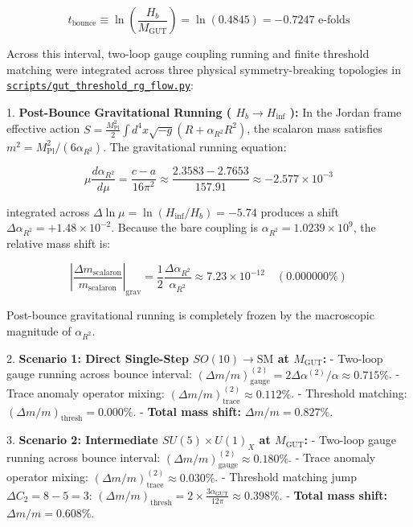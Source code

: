 \documentclass[11pt,a4paper]{article}
\theoremstyle{definition}
\theoremstyle{remark}
\begin{document}
\begin{equation}
t_{\text{bounce}} \equiv \ln\left(\frac{H_b}{M_{\text{GUT}}}\right) = \ln(0.4845) = -0.7247 \text{ e-folds}
\end{equation}


Across this interval, two-loop gauge coupling running and finite threshold matching were integrated across three physical symmetry-breaking topologies in \href{../../scripts/gut_threshold_rg_flow.py}{\texttt{scripts/gut_threshold_rg_flow.py}}:

1. \textbf{Post-Bounce Gravitational Running ( $H_b \to H_{\text{inf}}$ ):}
In the Jordan frame effective action $S = \frac{M_{\text{Pl}}^2}{2}\int d^4x\sqrt{-g}(R + \alpha_{R^2} R^2)$, the scalaron mass satisfies $m^2 = M_{\text{Pl}}^2 / (6\alpha_{R^2})$. The gravitational running equation:


\begin{equation}
\mu \frac{d\alpha_{R^2}}{d\mu} = \frac{c - a}{16\pi^2} \approx \frac{2.3583 - 2.7653}{157.91} \approx -2.577 \times 10^{-3}
\end{equation}


integrated across $\Delta\ln\mu = \ln(H_{\text{inf}}/H_b) = -5.74$ produces a shift $\Delta\alpha_{R^2} = +1.48 \times 10^{-2}$. Because the bare coupling is $\alpha_{R^2} = 1.0239 \times 10^9$, the relative mass shift is:


\begin{equation}
\left|\frac{\Delta m_{\text{scalaron}}}{m_{\text{scalaron}}}\right|_{\text{grav}} = \frac{1}{2} \frac{\Delta\alpha_{R^2}}{\alpha_{R^2}} \approx 7.23 \times 10^{-12} \quad (\mathbf{0.000000\%})
\end{equation}


Post-bounce gravitational running is completely frozen by the macroscopic magnitude of $\alpha_{R^2}$.

2. \textbf{Scenario 1: Direct Single-Step $SO(10) \to \text{SM}$ at $M_{\text{GUT}}$:}
- Two-loop gauge running across bounce interval: $(\Delta m/m)_{\text{gauge}}^{(2)} = 2 \Delta\alpha^{(2)}/\alpha \approx 0.715\%$.
- Trace anomaly operator mixing: $(\Delta m/m)_{\text{trace}}^{(2)} \approx 0.112\%$.
- Threshold matching: $(\Delta m/m)_{\text{thresh}} = 0.000\%$.
- \textbf{Total mass shift:} $\Delta m / m = 0.827\%$.

3. \textbf{Scenario 2: Intermediate $SU(5) \times U(1)_X$ at $M_{\text{GUT}}$:}
- Two-loop gauge running across bounce interval: $(\Delta m/m)_{\text{gauge}}^{(2)} \approx 0.180\%$.
- Trace anomaly operator mixing: $(\Delta m/m)_{\text{trace}}^{(2)} \approx 0.030\%$.
- Threshold matching jump $\Delta C_2 = 8 - 5 = 3$: $(\Delta m/m)_{\text{thresh}} = 2 \times \frac{3 \alpha_{\text{GUT}}}{12\pi} \approx 0.398\%$.
- \textbf{Total mass shift:} $\Delta m / m = 0.608\%$.
\end{document}
